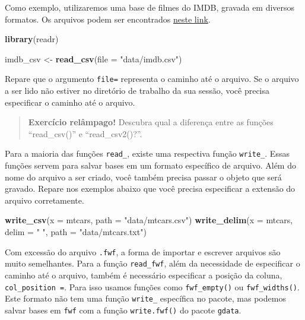 \documentclass[
]{book}
\newenvironment{Shaded}{\begin{snugshade}}{\end{snugshade}}
\newcommand{\DataTypeTok}[1]{\textcolor[rgb]{0.13,0.29,0.53}{#1}}
\newcommand{\KeywordTok}[1]{\textcolor[rgb]{0.13,0.29,0.53}{\textbf{#1}}}
\newcommand{\NormalTok}[1]{#1}
\newcommand{\StringTok}[1]{\textcolor[rgb]{0.31,0.60,0.02}{#1}}
\begin{document}
Como exemplo, utilizaremos uma base de filmes do IMDB, gravada em diversos formatos. Os arquivos podem ser encontrados \href{https://github.com/curso-r/site-v2/raw/master/content/material/importacao/data/imdb.rds}{neste link}.

\begin{Shaded}
\begin{Highlighting}[]
\KeywordTok{library}\NormalTok{(readr)}

\NormalTok{imdb\_csv <{-}}\StringTok{ }\KeywordTok{read\_csv}\NormalTok{(}\DataTypeTok{file =} \StringTok{"data/imdb.csv"}\NormalTok{)}
\end{Highlighting}
\end{Shaded}

Repare que o argumento \texttt{file=} representa o caminho até o arquivo. Se o arquivo a ser lido não estiver no diretório de trabalho da sua sessão, você precisa especificar o caminho até o arquivo.

\begin{quote}
\textbf{Exercício relâmpago!} Descubra qual a diferença entre as funções ``read\_csv()'' e ``read\_csv2()?''.
\end{quote}

Para a maioria das funções \texttt{read\_}, existe uma respectiva função \texttt{write\_}. Essas funções servem para salvar bases em um formato específico de arquivo. Além do nome do arquivo a ser criado, você também precisa passar o objeto que será gravado. Repare nos exemplos abaixo que você precisa especificar a extensão do arquivo corretamente.

\begin{Shaded}
\begin{Highlighting}[]
\KeywordTok{write\_csv}\NormalTok{(}\DataTypeTok{x =}\NormalTok{ mtcars, }\DataTypeTok{path =} \StringTok{"data/mtcars.csv"}\NormalTok{)}
\KeywordTok{write\_delim}\NormalTok{(}\DataTypeTok{x =}\NormalTok{ mtcars, }\DataTypeTok{delim =} \StringTok{" "}\NormalTok{, }\DataTypeTok{path =} \StringTok{"data/mtcars.txt"}\NormalTok{)}
\end{Highlighting}
\end{Shaded}

Com excessão do arquivo \texttt{.fwf}, a forma de importar e escrever arquivos são muito semelhantes. Para a função \texttt{read\_fwf}, além da necessidade de especificar o caminho até o arquivo, também é necessário especificar a posição da coluna, \texttt{col\_position\ =}. Para isso usamos funções como \texttt{fwf\_empty()} ou \texttt{fwf\_widths()}. Este formato não tem uma função \texttt{write\_} específica no pacote, mas podemos salvar bases em \texttt{fwf} com a função \texttt{write.fwf()} do pacote \texttt{gdata}.
\end{document}
